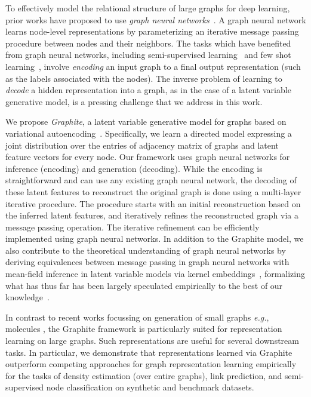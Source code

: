 \documentclass{article}
\newcommand{\name}{Graphite}
\begin{document}
To effectively model the relational structure of large graphs for deep learning, prior works have proposed to use \textit{graph neural networks}~\citep{gori2005new,scarselli2009graph,bruna2013spectral}. A graph neural network learns node-level representations by parameterizing an iterative message passing procedure between nodes and their neighbors.  
The tasks which have benefited from graph neural networks, including semi-supervised learning~\citep{kipf2016semi} and few shot learning~\citep{garcia2017few}, involve \textit{encoding} an input graph to a final output representation (such as the labels associated with the nodes). The inverse problem of learning to \textit{decode} a hidden representation into a graph, as in the case of a latent variable generative model, is a pressing challenge
that we address in this work. 

We propose \textit{\name{}}, a latent variable generative model 
for graphs based on variational autoencoding~\citep{kingma2013auto}. Specifically, we learn a directed model expressing a joint distribution over the entries of adjacency matrix of graphs 
and latent feature vectors for every node.
Our framework uses graph neural networks for inference (encoding) and generation (decoding).  
While the encoding is straightforward and can use any existing graph neural network, the decoding of these latent features to reconstruct the original graph is done using a multi-layer iterative procedure. The procedure starts with an initial reconstruction based on the inferred latent features, and iteratively refines the reconstructed graph via a message passing operation. 
The iterative refinement can be efficiently implemented using graph neural networks. 
In addition to the \name{} model, we also contribute to the theoretical understanding of graph neural networks by deriving equivalences between message passing in graph neural networks with mean-field inference in latent variable models via kernel embeddings~\citep{smola2007hilbert,dai2016discriminative}, formalizing what has thus far has been largely speculated empirically to the best of our knowledge~\citep{yoon2018inference}.

In contrast to recent works focussing on generation of small graphs \textit{e.g.}, molecules
\citep{you2018graphrnn,li2018learning}, the \name{} framework is particularly suited for representation learning on large graphs. Such representations are useful for several downstream tasks. In particular, we demonstrate that representations learned via \name{} outperform competing approaches for graph representation learning empirically for the tasks of density estimation (over entire graphs), link prediction, and semi-supervised node classification on synthetic and benchmark datasets. 
\end{document}
